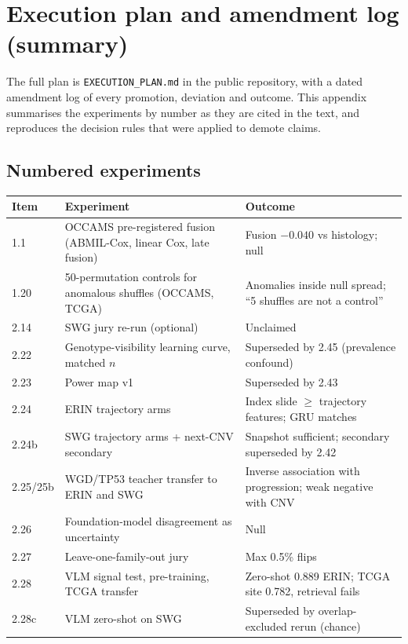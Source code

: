\chapter{Execution plan and amendment log (summary)}
\label{app:plan}

The full plan is \texttt{EXECUTION\_PLAN.md} in the public repository, with a dated amendment log of every promotion, deviation and outcome. This appendix summarises the experiments by number as they are cited in the text, and reproduces the decision rules that were applied to demote claims.

\section{Numbered experiments}

\begin{small}
\begin{longtable}{@{}p{1.2cm}p{6.6cm}p{6.4cm}@{}}
\toprule
Item & Experiment & Outcome \\
\midrule
\endhead
1.1 & OCCAMS pre-registered fusion (ABMIL-Cox, linear Cox, late fusion) & Fusion $-0.040$ vs histology; null \\
1.20 & 50-permutation controls for anomalous shuffles (OCCAMS, TCGA) & Anomalies inside null spread; ``5 shuffles are not a control'' \\
2.14 & SWG jury re-run (optional) & Unclaimed \\
2.22 & Genotype-visibility learning curve, matched $n$ & Superseded by 2.45 (prevalence confound) \\
2.23 & Power map v1 & Superseded by 2.43 \\
2.24 & ERIN trajectory arms & Index slide $\ge$ trajectory features; GRU matches \\
2.24b & SWG trajectory arms + next-CNV secondary & Snapshot sufficient; secondary superseded by 2.42 \\
2.25/25b & WGD/TP53 teacher transfer to ERIN and SWG & Inverse association with progression; weak negative with CNV \\
2.26 & Foundation-model disagreement as uncertainty & Null \\
2.27 & Leave-one-family-out jury & Max 0.5\% flips \\
2.28 & VLM signal test, pre-training, TCGA transfer & Zero-shot 0.889 ERIN; TCGA site 0.782, retrieval fails \\
2.28c & VLM zero-shot on SWG & Superseded by overlap-excluded rerun (chance) \\

\end{longtable}
\end{small}
